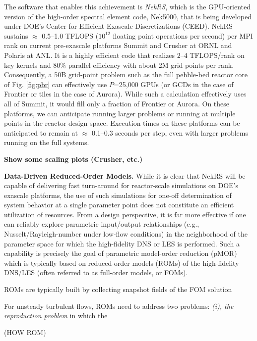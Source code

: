The software that enables this achievement is {\em NekRS}, which is the
GPU-oriented version of the high-order spectral element code, Nek5000, that
is being developed under DOE's Center for Efficient Exascale Discretizations
(CEED). NekRS sustains $\approx$ 0.5--1.0 TFLOPS ($10^{12}$ floating point
operations per second) per MPI rank on current pre-exascale platforms Summit
and Crusher at ORNL and Polaris at ANL.  It is a highly efficient code that
realizes 2--4 TFLOPS/rank on key kernels and 80\% parallel efficiency with
about 2M grid points per rank.  Consequently, a 50B grid-point problem such as
the full pebble-bed reactor core of Fig. \ref{fig:pbr} can effectively use
$P$=25,000 GPUs (or GCDs in the case of Frontier or tiles in the case of
Aurora).  While such a calculation effectively uses all of Summit, it would
fill only a fraction of Frontier or Aurora.  On these platforms, we can
anticipate running larger problems or running at multiple points in the reactor
design space.  Execution times on these platforms can be anticipated to remain
at $\approx$ 0.1--0.3 seconds per step, even with larger problems
running on the full systems.


{\bf Show some scaling plots (Crusher, etc.)}

\noindent
{\bf Data-Driven Reduced-Order Models.}
While it is clear that NekRS will be capable of delivering fast turn-around
for reactor-scale simulations on DOE's exascale platforms, the use of 
such simulations for one-off determination of system behavior at a single
parameter point does not constitute an efficient utilization of resources. 
From a design perspective, it is far more effective if one can reliably explore
parametric input/output relationships (e.g., Nusselt/Rayleigh-number under
low-flow conditions) in the neighborhood of the parameter space for which
the high-fidelity DNS or LES is performed.   Such a capability is precisely
the goal of parametric model-order reduction (pMOR) which is typically based
on reduced-order models (ROMs) of the high-fidelity DNS/LES (often referred
to as full-order models, or FOMs).   

ROMs are typically built by collecting snapshot fields of the FOM solution


For unsteady turbulent flows, ROMs need to address two problems: 
{\em (i), the reproduction problem} in which the 




(HOW ROM)










